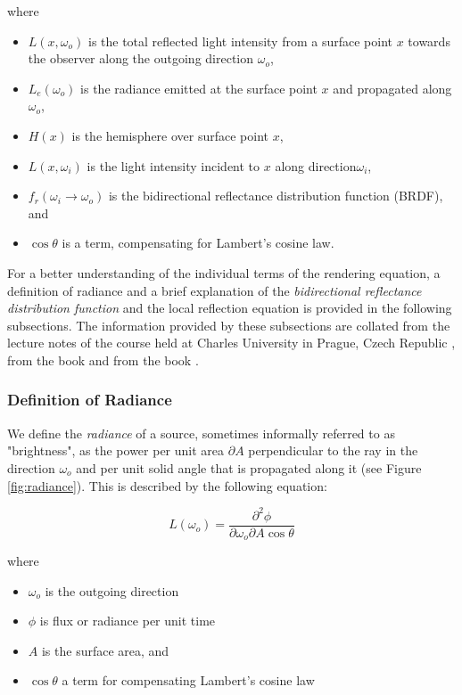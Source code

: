 \noindent where
\begin{itemize}
	\setlength\itemsep{0.05em}
	\item  $L(x, \omega_{o})$ is the total reflected light intensity from a surface point $x$ towards the observer along the outgoing direction $\omega_{o}$,
	\item  $L_{e}(\omega_{o})$ is the radiance emitted at the surface point $x$ and propagated along $\omega_{o}$,
	\item  $H(x)$ is the hemisphere over surface point $x$,
	\item 	$L(x, \omega_{i})$ is the light intensity incident to $x$ along direction$\omega_{i}$, 
	\item  $f_{r}(\omega_{i} \rightarrow \omega_{o})$ is the bidirectional reflectance distribution function (BRDF), and 
	\item  $\cos\theta$ is a term, compensating for Lambert's cosine law.
\end{itemize}

For a better understanding of the individual terms of the rendering equation, a definition of radiance and a brief explanation of the \emph{bidirectional reflectance distribution function} and the local reflection equation is provided in the following subsections.
The information provided by these subsections are collated from the lecture notes of the course  held at Charles University in Prague, Czech Republic \cite{cg3}, from the book  \cite{pharr2016physically} and from the book  \cite{hughesDamEtAl13}.

\subsubsection{Definition of Radiance}

We define the \emph{radiance} of a source, sometimes informally referred to as "brightness", as the power per unit area $\partial A$ perpendicular to the ray in the direction $\omega_{o}$ and per unit solid angle that is propagated along it (see Figure \ref{fig:radiance}). This is described by the following equation:

\begin{equation}
L(\omega_{o}) = \frac{\partial^2\phi}{\partial\omega_{o}\partial A\cos\theta}
\end{equation}

\noindent where
\begin{itemize}
	\setlength\itemsep{0.05em}
	\item  $\omega_{o}$ is the outgoing direction
	\item  $\phi$ is flux or radiance per unit time
	\item  $A$ is the surface area, and
	\item  $\cos\theta$ a term for compensating Lambert's cosine law
\end{itemize}

